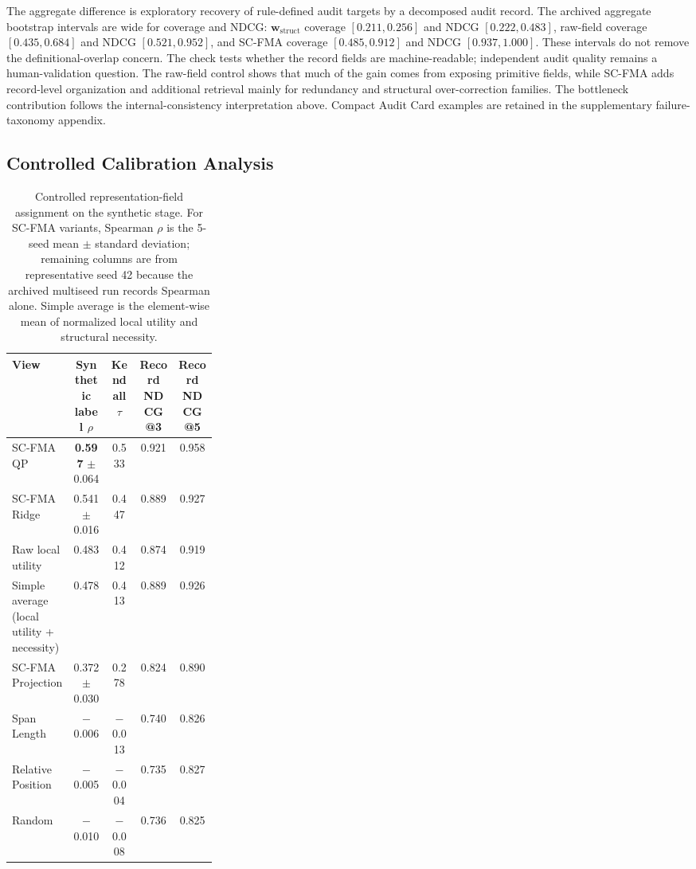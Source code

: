 \documentclass[pdflatex,sn-mathphys-num,iicol]{sn-jnl}
\newcommand{\wstruct}{\ensuremath{\mathbf{w}_{\mathrm{struct}}}}
\begin{document}
The aggregate difference is exploratory recovery of rule-defined audit targets by a decomposed audit record. The archived aggregate bootstrap intervals are wide for coverage and NDCG: \wstruct{} coverage $[0.211,0.256]$ and NDCG $[0.222,0.483]$, raw-field coverage $[0.435,0.684]$ and NDCG $[0.521,0.952]$, and SC-FMA coverage $[0.485,0.912]$ and NDCG $[0.937,1.000]$. These intervals do not remove the definitional-overlap concern. The check tests whether the record fields are machine-readable; independent audit quality remains a human-validation question. The raw-field control shows that much of the gain comes from exposing primitive fields, while SC-FMA adds record-level organization and additional retrieval mainly for redundancy and structural over-correction families. The bottleneck contribution follows the internal-consistency interpretation above. Compact Audit Card examples are retained in the supplementary failure-taxonomy appendix.


\subsection{Controlled Calibration Analysis}
\label{sec:controlled-calibration}

\begin{table}[t]
\caption{Controlled representation-field assignment on the synthetic stage. For SC-FMA variants, Spearman $\rho$ is the 5-seed mean $\pm$ standard deviation; remaining columns are from representative seed 42 because the archived multiseed run records Spearman alone. Simple average is the element-wise mean of normalized local utility and structural necessity.}
\label{tab:controlled-calibration-results}
\centering
\small
\begin{tabular}{Z{0.30\linewidth}cccc}
\toprule
\textbf{View} & \textbf{Synthetic label $\rho$} & \textbf{Kendall $\tau$} & \textbf{Record NDCG@3} & \textbf{Record NDCG@5} \\
\midrule
SC-FMA QP                  & \textbf{0.597} $\pm$ 0.064 & 0.533 & 0.921 & 0.958 \\
SC-FMA Ridge               & 0.541 $\pm$ 0.016 & 0.447 & 0.889 & 0.927 \\
Raw local utility          & 0.483 & 0.412 & 0.874 & 0.919 \\
Simple average (local utility + necessity) & 0.478 & 0.413 & 0.889 & 0.926 \\
SC-FMA Projection          & 0.372 $\pm$ 0.030 & 0.278 & 0.824 & 0.890 \\
Span Length                & $-$0.006 & $-$0.013 & 0.740 & 0.826 \\
Relative Position          & $-$0.005 & $-$0.004 & 0.735 & 0.827 \\
Random                     & $-$0.010 & $-$0.008 & 0.736 & 0.825 \\
\bottomrule
\end{tabular}
\end{table}
\end{document}
